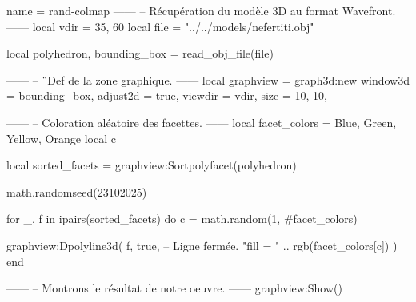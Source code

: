 \documentclass{standalone}
\begin{document}
\begin{luadraw}{name = rand-colmap}
------
-- Récupération du modèle 3D au format Wavefront.
------
local vdir = {35, 60}
local file = "../../models/nefertiti.obj"

local polyhedron, bounding_box = read_obj_file(file)

------
-- ¨Def de la zone graphique.
------
local graphview = graph3d:new{
  window3d = bounding_box,
  adjust2d = true,
  viewdir  = vdir,
  size     = {10, 10},
}

------
-- Coloration aléatoire des facettes.
------
local facet_colors = {Blue, Green, Yellow, Orange}
local c

local sorted_facets = graphview:Sortpolyfacet(polyhedron)

math.randomseed(23102025)

for _, f in ipairs(sorted_facets) do
  c = math.random(1, #facet_colors)

  graphview:Dpolyline3d(
    f,
    true,  -- Ligne fermée.
    "fill = " .. rgb(facet_colors[c])
  )
end

------
-- Montrons le résultat de notre oeuvre.
------
graphview:Show()
\end{luadraw}
\end{document}
